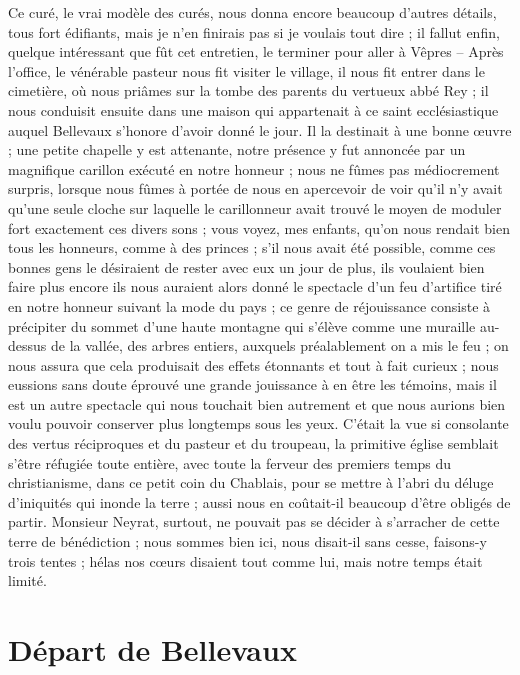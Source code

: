 \documentclass[11pt,a4paper]{report}
\begin{document}
Ce curé, le vrai modèle des curés, nous donna encore beaucoup d'autres détails, tous fort édifiants, mais je n'en finirais pas si je voulais tout dire ; il fallut enfin, quelque intéressant que fût cet entretien, le terminer pour aller à Vêpres -- Après l'office, le vénérable pasteur nous fit visiter le village, il nous fit entrer dans le cimetière, où nous priâmes sur la tombe des parents du vertueux abbé Rey ; il nous conduisit ensuite dans une maison qui appartenait à ce saint ecclésiastique auquel Bellevaux s'honore d'avoir donné le jour. Il la destinait à une bonne œuvre ; une petite chapelle y est attenante, notre présence y fut annoncée par un magnifique carillon exécuté en notre honneur ; nous ne fûmes pas médiocrement surpris, lorsque nous fûmes à portée de nous en apercevoir de voir qu'il n'y avait qu'une seule cloche sur laquelle le carillonneur avait trouvé le moyen de moduler fort exactement ces divers sons ; vous voyez, mes enfants, qu'on nous rendait bien tous les honneurs, comme à des princes ; s'il nous avait été possible, comme ces bonnes gens le désiraient de rester avec eux un jour de plus, ils voulaient bien faire plus encore ils nous auraient alors donné le spectacle d'un feu d'artifice tiré en notre honneur suivant la mode du pays ; ce genre de réjouissance consiste à précipiter du sommet d'une haute montagne qui s'élève comme une muraille au-dessus de la vallée, des arbres entiers, auxquels préalablement on a mis le feu ; on nous assura que cela produisait des effets étonnants et tout à fait curieux ; nous eussions sans doute éprouvé une grande jouissance à en être les témoins, mais il est un autre spectacle qui nous touchait bien autrement et que nous aurions bien voulu pouvoir conserver plus longtemps sous les yeux. C'était la vue si consolante des vertus réciproques et du pasteur et du troupeau, la primitive église semblait s'être réfugiée toute entière, avec toute la ferveur des premiers temps du christianisme, dans ce petit coin du Chablais, pour se mettre à l'abri du déluge d'iniquités qui inonde la terre ; aussi nous en coûtait-il beaucoup d'être obligés de partir. Monsieur Neyrat, surtout, ne pouvait pas se décider à s'arracher de cette terre de bénédiction ; nous sommes bien ici, nous disait-il sans cesse, faisons-y trois tentes ; hélas nos cœurs disaient tout comme lui, mais notre temps était limité.

\section*{Départ de Bellevaux}
\end{document}
